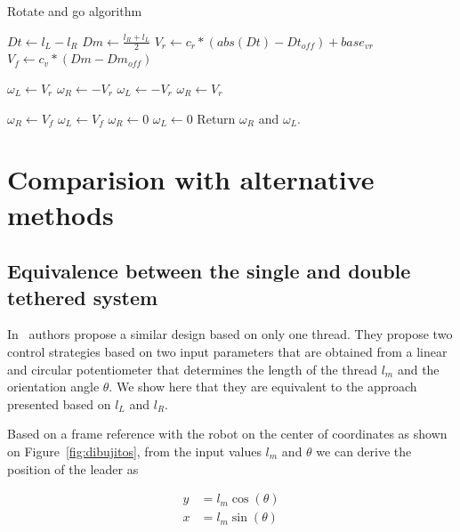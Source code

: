 \documentclass[journal]{IEEEtran}
\begin{document}
\begin{algorithm}[]
\caption{Rotate and go algorithm}
\begin{algorithmic}
\STATE $Dt \gets l_L - l_R$
\STATE $Dm \gets \frac{l_R+l_L}{2}$
\STATE $V_r \gets c_r * (abs(Dt) - Dt_{off}) + base_{vr}$ 
\STATE $V_f \gets c_v * (Dm - Dm_{off})$

\STATE $\omega_{L} \gets V_r$
\STATE $\omega_{R} \gets -V_r$
\ELSE
\STATE $\omega_{L} \gets -V_r$
\STATE $\omega_{R} \gets V_r$
\ENDIF

\ELSE
{}
\STATE $\omega_{R} \gets V_f$
\STATE $\omega_{L} \gets V_f$
\ELSE
\STATE $\omega_{R} \gets 0$
\STATE $\omega_{L} \gets 0$
\ENDIF
\ENDIF
\STATE Return $\omega_{R}$ and $\omega_{L}$.
\end{algorithmic}
\label{alg:rotateandgoalg}
\end{algorithm}

\section{Comparision with alternative methods} \label{development}

\subsection{Equivalence between the single and double tethered system}


In~\cite{Endo2015} authors propose a similar design based on only one thread.  They propose two control strategies based on two input parameters that are obtained from a linear and circular potentiometer that determines the length of the thread $l_m$ and the orientation angle $\theta$.  We show here that they are equivalent to the approach presented based on $l_L$ and  $l_R$.

Based on a frame reference with the robot on the center of coordinates as shown on Figure~\ref{fig:dibujitos}, from the input values $l_m$ and $\theta$ we can derive the position of the leader as

\begin{align*}
   y &= l_m  \cos(\theta)\\
   x &= l_m  \sin(\theta) \\
\end{align*}
\end{document}
